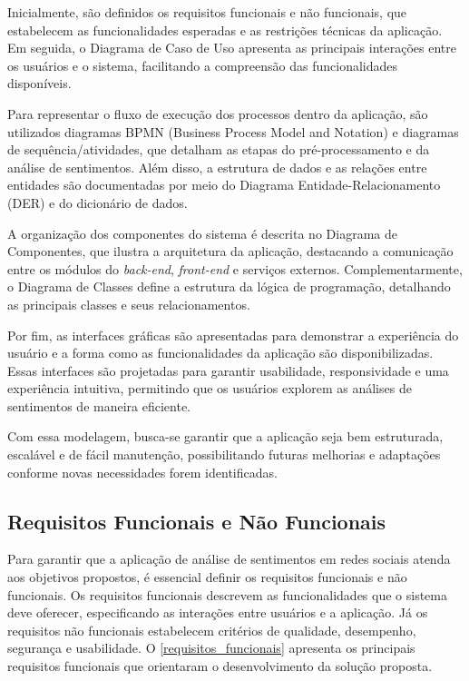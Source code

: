\documentclass[
	12pt,				%
	oneside,			%
	a4paper,			%
	english,			%
	french,				%
	spanish,			%
	brazil				%
	]{abntex2}
\begin{document}
Inicialmente, são definidos os requisitos funcionais e não funcionais,
que estabelecem as funcionalidades esperadas e as restrições técnicas da
aplicação. Em seguida, o Diagrama de Caso de Uso apresenta as principais
interações entre os usuários e o sistema, facilitando a compreensão das
funcionalidades disponíveis.

Para representar o fluxo de execução dos processos dentro da aplicação,
são utilizados diagramas BPMN (Business Process Model and Notation) e
diagramas de sequência/atividades, que detalham as etapas do
pré-processamento e da análise de sentimentos. Além disso, a estrutura
de dados e as relações entre entidades são documentadas por meio do
Diagrama Entidade-Relacionamento (DER) e do dicionário de dados.

A organização dos componentes do sistema é descrita no Diagrama de
Componentes, que ilustra a arquitetura da aplicação, destacando a
comunicação entre os módulos do \emph{back-end}, \emph{front-end} e
serviços externos. Complementarmente, o Diagrama de Classes define a
estrutura da lógica de programação, detalhando as principais classes e
seus relacionamentos.

Por fim, as interfaces gráficas são apresentadas para demonstrar a
experiência do usuário e a forma como as funcionalidades da aplicação
são disponibilizadas. Essas interfaces são projetadas para garantir
usabilidade, responsividade e uma experiência intuitiva, permitindo que
os usuários explorem as análises de sentimentos de maneira eficiente.

Com essa modelagem, busca-se garantir que a aplicação seja bem
estruturada, escalável e de fácil manutenção, possibilitando futuras
melhorias e adaptações conforme novas necessidades forem identificadas.

\hypertarget{requisitos-funcionais-e-nuxe3o-funcionais}{%
\subsection{Requisitos Funcionais e Não
Funcionais}\label{requisitos-funcionais-e-nuxe3o-funcionais}}

Para garantir que a aplicação de análise de sentimentos em redes sociais
atenda aos objetivos propostos, é essencial definir os requisitos
funcionais e não funcionais. Os requisitos funcionais descrevem as
funcionalidades que o sistema deve oferecer, especificando as interações
entre usuários e a aplicação. Já os requisitos não funcionais
estabelecem critérios de qualidade, desempenho, segurança e usabilidade.
O \autoref{requisitos_funcionais} apresenta os principais requisitos
funcionais que orientaram o desenvolvimento da solução proposta.
\end{document}
